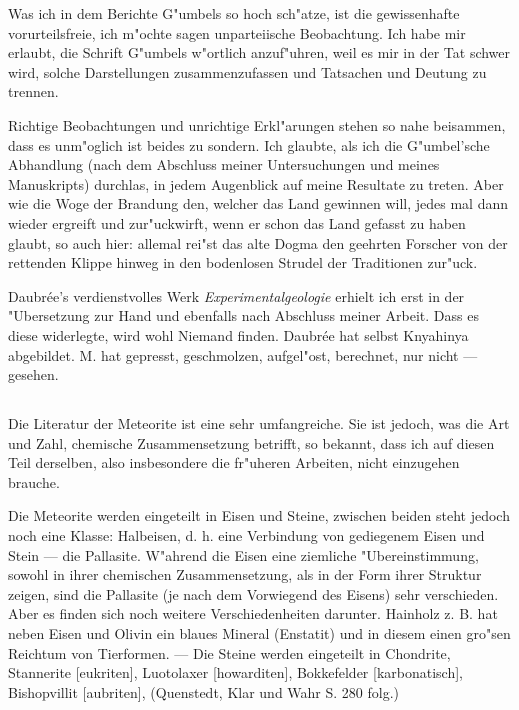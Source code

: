 \documentclass[a4paper, 11pt, oneside]{article}
\begin{document}
Was ich in dem Berichte G"umbels so hoch sch"atze, ist die gewissenhafte vorurteilsfreie, ich m"ochte sagen unparteiische Beobachtung. Ich habe mir erlaubt, die Schrift G"umbels w"ortlich anzuf"uhren, weil es mir in der Tat schwer wird, solche Darstellungen zusammenzufassen und Tatsachen und Deutung zu trennen.

Richtige Beobachtungen und unrichtige Erkl"arungen stehen so nahe beisammen, dass es unm"oglich ist beides zu sondern. Ich glaubte, als ich die G"umbel'sche Abhandlung (nach dem Abschluss meiner Untersuchungen und meines Manuskripts) durchlas, in jedem Augenblick auf meine Resultate zu treten. Aber wie die Woge der Brandung den, welcher das Land gewinnen will, jedes mal dann wieder ergreift und zur"uckwirft, wenn er schon das Land gefasst zu haben glaubt, so auch hier: allemal rei"st das alte Dogma den geehrten Forscher von der rettenden Klippe hinweg in den bodenlosen Strudel der Traditionen zur"uck.

Daubrée's verdienstvolles Werk \emph{Experimentalgeologie} erhielt ich erst in der "Ubersetzung zur Hand und ebenfalls nach Abschluss meiner Arbeit. Dass es diese widerlegte, wird wohl Niemand finden. Daubrée hat selbst Knyahinya abgebildet. M. hat gepresst, geschmolzen, aufgel"ost, berechnet, nur nicht --- gesehen.
\clearpage
\subsection{}
\paragraph{}
Die Literatur der Meteorite ist eine sehr umfangreiche. Sie ist jedoch, was die Art und Zahl, chemische Zusammensetzung betrifft, so bekannt, dass ich auf diesen Teil derselben, also insbesondere die fr"uheren Arbeiten, nicht einzugehen brauche.

Die Meteorite werden eingeteilt in Eisen und Steine, zwischen beiden steht jedoch noch eine Klasse: Halbeisen, d. h. eine Verbindung von gediegenem Eisen und Stein --- die Pallasite. W"ahrend die Eisen eine ziemliche "Ubereinstimmung, sowohl in ihrer chemischen Zusammensetzung, als in der Form ihrer Struktur zeigen, sind die Pallasite (je nach dem Vorwiegend des Eisens) sehr verschieden. Aber es finden sich noch weitere Verschiedenheiten darunter. Hainholz z. B. hat neben Eisen und Olivin ein blaues Mineral (Enstatit) und in diesem einen gro"sen Reichtum von Tierformen. --- Die Steine werden eingeteilt in Chondrite, Stannerite [eukriten], Luotolaxer [howarditen], Bokkefelder [karbonatisch], Bishopvillit [aubriten], (Quenstedt, Klar und Wahr S. 280 folg.)
\end{document}
